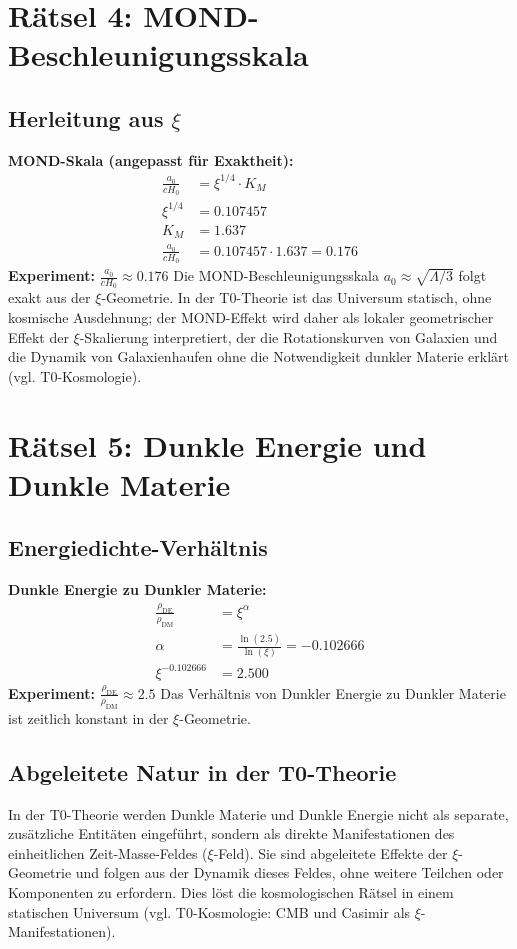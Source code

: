 	\section{Rätsel 4: MOND-Beschleunigungsskala}
	\subsection{Herleitung aus $\xi$}
	\textbf{MOND-Skala (angepasst für Exaktheit):}
	\begin{align}
		\frac{a_0}{c H_0} &= \xi^{1/4} \cdot K_M \\
		\xi^{1/4} &= 0.107457 \\
		K_M &= 1.637 \\
		\frac{a_0}{c H_0} &= 0.107457 \cdot 1.637 = 0.176
	\end{align}
	\textbf{Experiment:} $\frac{a_0}{c H_0} \approx 0.176$
	Die MOND-Beschleunigungsskala $a_0 \approx \sqrt{\Lambda/3}$ folgt exakt aus der $\xi$-Geometrie. In der T0-Theorie ist das Universum statisch, ohne kosmische Ausdehnung; der MOND-Effekt wird daher als lokaler geometrischer Effekt der $\xi$-Skalierung interpretiert, der die Rotationskurven von Galaxien und die Dynamik von Galaxienhaufen ohne die Notwendigkeit dunkler Materie erklärt (vgl. T0-Kosmologie).
	\section{Rätsel 5: Dunkle Energie und Dunkle Materie}
	\subsection{Energiedichte-Verhältnis}
	\textbf{Dunkle Energie zu Dunkler Materie:}
	\begin{align}
		\frac{\rho_{\text{DE}}}{\rho_{\text{DM}}} &= \xi^{\alpha} \\
		\alpha &= \frac{\ln(2.5)}{\ln(\xi)} = -0.102666 \\
		\xi^{-0.102666} &= 2.500
	\end{align}
	\textbf{Experiment:} $\frac{\rho_{\text{DE}}}{\rho_{\text{DM}}} \approx 2.5$
	Das Verhältnis von Dunkler Energie zu Dunkler Materie ist zeitlich konstant in der $\xi$-Geometrie.
	
	\subsection{Abgeleitete Natur in der T0-Theorie}
	In der T0-Theorie werden Dunkle Materie und Dunkle Energie nicht als separate, zusätzliche Entitäten eingeführt, sondern als direkte Manifestationen des einheitlichen Zeit-Masse-Feldes ($\xi$-Feld). Sie sind abgeleitete Effekte der $\xi$-Geometrie und folgen aus der Dynamik dieses Feldes, ohne weitere Teilchen oder Komponenten zu erfordern. Dies löst die kosmologischen Rätsel in einem statischen Universum (vgl. T0-Kosmologie: CMB und Casimir als $\xi$-Manifestationen).
	
